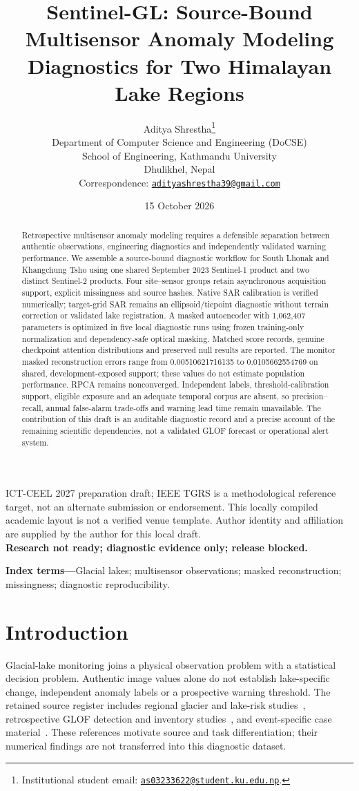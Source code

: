 \documentclass[10pt,twocolumn]{article}
\title{Sentinel-GL: Source-Bound Multisensor Anomaly Modeling Diagnostics for Two Himalayan Lake Regions}
\author{Aditya Shrestha\thanks{Institutional student email: \href{mailto:as03233622@student.ku.edu.np}{\nolinkurl{as03233622@student.ku.edu.np}}.}\\[-1pt]
\small Department of Computer Science and Engineering (DoCSE)\\
\small School of Engineering, Kathmandu University\\
\small Dhulikhel, Nepal\\[2pt]
\small Correspondence: \href{mailto:adityashrestha39@gmail.com}{\nolinkurl{adityashrestha39@gmail.com}}}
\date{15 October 2026}
\begin{document}
\maketitle
\begin{center}\small
ICT-CEEL 2027 preparation draft; IEEE TGRS is a methodological reference target, not an alternate submission or endorsement. This locally compiled academic layout is not a verified venue template. Author identity and affiliation are supplied by the author for this local draft.\\[3pt]
\textbf{Research not ready; diagnostic evidence only; release blocked.}
\end{center}
\begin{abstract}
Retrospective multisensor anomaly modeling requires a defensible separation between authentic observations, engineering diagnostics and independently validated warning performance. We assemble a source-bound diagnostic workflow for South Lhonak and Khangchung Tsho using one shared September 2023 Sentinel-1 product and two distinct Sentinel-2 products. Four site--sensor groups retain asynchronous acquisition support, explicit missingness and source hashes. Native SAR calibration is verified numerically; target-grid SAR remains an ellipsoid/tiepoint diagnostic without terrain correction or validated lake registration. A masked autoencoder with 1,062,407 parameters is optimized in five local diagnostic runs using frozen training-only normalization and dependency-safe optical masking. Matched score records, genuine checkpoint attention distributions and preserved null results are reported. The monitor masked reconstruction errors range from 0.00510621716135 to 0.0105662554769 on shared, development-exposed support; these values do not estimate population performance. RPCA remains nonconverged. Independent labels, threshold-calibration support, eligible exposure and an adequate temporal corpus are absent, so precision--recall, annual false-alarm trade-offs and warning lead time remain unavailable. The contribution of this draft is an auditable diagnostic record and a precise account of the remaining scientific dependencies, not a validated GLOF forecast or operational alert system.
\end{abstract}
\noindent\textbf{Index terms---}Glacial lakes; multisensor observations; masked reconstruction; missingness; diagnostic reproducibility.

\section{Introduction}
Glacial-lake monitoring joins a physical observation problem with a statistical decision problem. Authentic image values alone do not establish lake-specific change, independent anomaly labels or a prospective warning threshold. The retained source register includes regional glacier and lake-risk studies~\cite{LIT001,LIT004,LIT005,LIT006}, retrospective GLOF detection and inventory studies~\cite{LIT002,LIT003}, and event-specific case material~\cite{LIT010,LIT011,LIT012}. These references motivate source and task differentiation; their numerical findings are not transferred into this diagnostic dataset.
\end{document}

